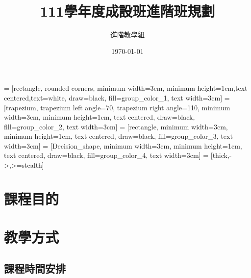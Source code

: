 \documentclass[12pt,oneside]{article}
\title{ 111學年度成設班進階班規劃 }
\author{ 進階教學組 }
\date{ \today }
\begin{document}







 = [rectangle, rounded corners, minimum width=3cm, minimum height=1cm,text centered,text=white, draw=black, fill=group_color_1, text width=3cm]
 = [trapezium, trapezium left angle=70, trapezium right angle=110, minimum width=3cm, minimum height=1cm, text centered, draw=black, fill=group_color_2, text width=3cm]
 = [rectangle, minimum width=3cm, minimum height=1cm, text centered, draw=black, fill=group_color_3, text width=3cm]
 = [Decision_shape, minimum width=3cm, minimum height=1cm, text centered, draw=black, fill=group_color_4, text width=3cm]
 = [thick,->,>=stealth]





\pagestyle{empty}
\maketitle

\thispagestyle{empty}

\clearpage

\tableofcontents
\pagestyle{plain}
\setcounter{page}{0}
\clearpage

\section{課程目的}

\section{教學方式}
\subsection{課程時間安排}
\end{document}
